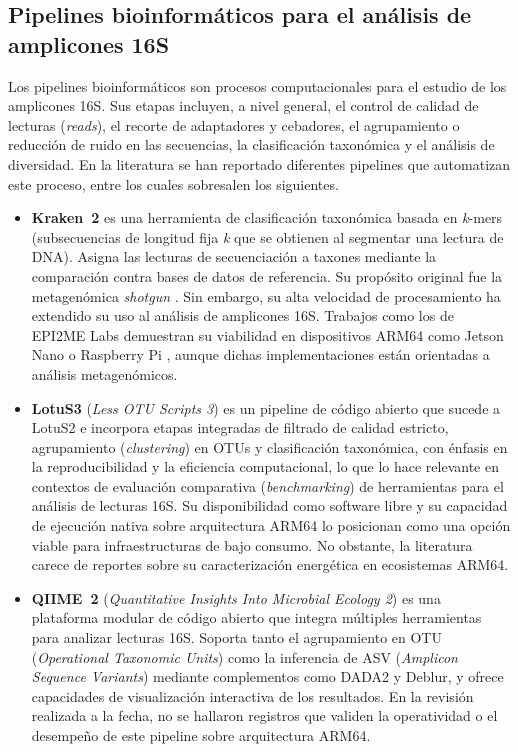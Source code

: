 \documentclass[12pt,oneside,spanish]{book}
\begin{document}
    \subsection{Pipelines bioinformáticos para el análisis de amplicones 16S}
    
    Los pipelines bioinformáticos son procesos computacionales para el estudio de los amplicones 16S. Sus etapas incluyen, a nivel general, el control de calidad de lecturas (\textit{reads}), el recorte de adaptadores y cebadores, el agrupamiento o reducción de ruido en las secuencias, la clasificación taxonómica y el análisis de diversidad. En la literatura se han reportado diferentes pipelines que automatizan este proceso, entre los cuales sobresalen los siguientes.
    
    \begin{itemize}
        \item \textbf{Kraken~2} \citep{wood2019kraken2} es una herramienta de clasificación taxonómica basada en \textit{k}-mers (subsecuencias de longitud fija \textit{k} que se obtienen al segmentar una lectura de DNA). Asigna las lecturas de secuenciación a taxones mediante la comparación contra bases de datos de referencia. Su propósito original fue la metagenómica \textit{shotgun} \citep{quince2017shotgun}. Sin embargo, su alta velocidad de procesamiento ha extendido su uso al análisis de amplicones 16S. Trabajos como los de EPI2ME Labs demuestran su viabilidad en dispositivos ARM64 como Jetson Nano o Raspberry Pi \citep{ont2024wfmetagenomics}, aunque dichas implementaciones están orientadas a análisis metagenómicos.
    
        \item \textbf{LotuS3} (\textit{Less OTU Scripts 3}) \citep{hildebrand2024lotus3} es un pipeline de código abierto que sucede a LotuS2 \citep{ozkurt2022lotus2} e incorpora etapas integradas de filtrado de calidad estricto, agrupamiento (\textit{clustering}) en OTUs y clasificación taxonómica, con énfasis en la reproducibilidad y la eficiencia computacional, lo que lo hace relevante en contextos de evaluación comparativa (\textit{benchmarking}) de herramientas para el análisis de lecturas 16S. Su disponibilidad como software libre y su capacidad de ejecución nativa sobre arquitectura ARM64 lo posicionan como una opción viable para infraestructuras de bajo consumo. No obstante, la literatura carece de reportes sobre su caracterización energética en ecosistemas ARM64.
    
        \item \textbf{QIIME~2} (\textit{Quantitative Insights Into Microbial Ecology 2}) \citep{bolyen2019qiime2} es una plataforma modular de código abierto que integra múltiples herramientas para analizar lecturas 16S. Soporta tanto el agrupamiento en OTU (\textit{Operational Taxonomic Units}) como la inferencia de ASV (\textit{Amplicon Sequence Variants}) mediante complementos como DADA2 y Deblur, y ofrece capacidades de visualización interactiva de los resultados. En la revisión realizada a la fecha, no se hallaron registros que validen la operatividad o el desempeño de este pipeline sobre arquitectura ARM64.
    

\end{itemize}
\end{document}

